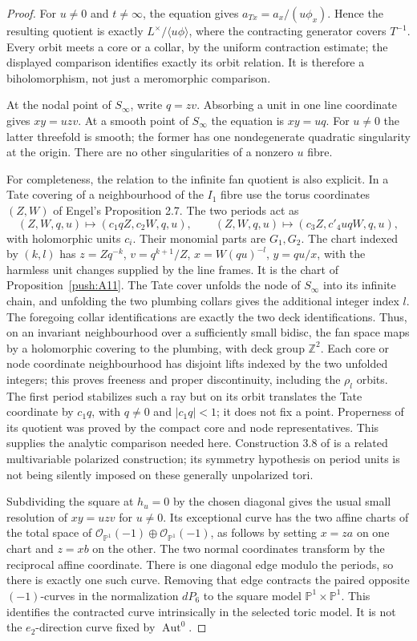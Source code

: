 \begin{proof}
For $u\ne0$ and $t\ne\infty$, the equation gives
$a_{Tx}=a_x/(u\phi_x)$. Hence the resulting quotient is exactly
$L^\times/\langle u\phi\rangle$, where the contracting generator
covers $T^{-1}$. Every orbit meets a core or a collar, by the
uniform contraction estimate; the displayed comparison identifies
exactly its orbit relation. It is therefore a biholomorphism,
not just a meromorphic comparison.

At the nodal point of $S_\infty$, write $q=zv$. Absorbing a unit
in one line coordinate gives $xy=uzv$. At a smooth point of
$S_\infty$ the equation is $xy=uq$. For $u\ne0$ the latter
threefold is smooth; the former has one nondegenerate quadratic
singularity at the origin. There are no other singularities of a
nonzero $u$ fibre.

For completeness, the relation to the infinite fan quotient is
also explicit. In a Tate covering of a neighbourhood of the $I_1$
fibre use the torus coordinates $(Z,W)$ of Engel's Proposition 2.7.
The two periods act as
\[
 (Z,W,q,u)\longmapsto(c_1qZ,c_2W,q,u),\qquad
 (Z,W,q,u)\longmapsto(c_3Z,c'_4uqW,q,u),
\]
with holomorphic units $c_i$. Their monomial parts are $G_1,G_2$.
The chart indexed by $(k,l)$ has
$z=Zq^{-k}$, $v=q^{k+1}/Z$, $x=W(qu)^{-l}$,
$y=qu/x$, with the harmless unit changes supplied by the line
frames. It is the chart of Proposition~\ref{push:A11}.
The Tate cover unfolds the node of $S_\infty$ into its infinite
chain, and unfolding the two plumbing collars gives the additional
integer index $l$. The foregoing collar identifications are exactly
the two deck identifications. Thus, on an invariant neighbourhood
over a sufficiently small bidisc, the fan space maps by a
holomorphic covering to the plumbing, with deck group $\mathbb Z^2$.
Each core or node coordinate neighbourhood has disjoint lifts
indexed by the two unfolded integers; this proves freeness and
proper discontinuity, including the $\rho_l$ orbits. The first
period stabilizes such a ray but on its orbit translates the Tate
coordinate by $c_1q$, with $q\ne0$ and $|c_1q|<1$; it does not
fix a point. Properness of its quotient was proved by the compact
core and node representatives. This supplies the analytic
comparison needed here. Construction 3.8 of \cite{EGFS25} is a
related multivariable polarized construction; its symmetry
hypothesis on period units is not being silently imposed on these
generally unpolarized tori.

Subdividing the square at $h_u=0$ by the chosen diagonal gives
the usual small resolution of $xy=uzv$ for $u\ne0$. Its exceptional
curve has the two affine charts of the total space of
$\mathcal O_{\mathbb P^1}(-1)\oplus
\mathcal O_{\mathbb P^1}(-1)$, as follows by setting $x=za$ on
one chart and $z=xb$ on the other. The two normal coordinates
transform by the reciprocal affine coordinate. There is one
diagonal edge modulo the periods, so there is exactly one such
curve. Removing that edge contracts the paired opposite
$(-1)$-curves in the normalization $dP_6$ to the square model
$\mathbb P^1\times\mathbb P^1$. This identifies the contracted
curve intrinsically in the selected toric model. It is not the
$e_2$-direction curve fixed by $\operatorname{Aut}^0$.
\end{proof}

